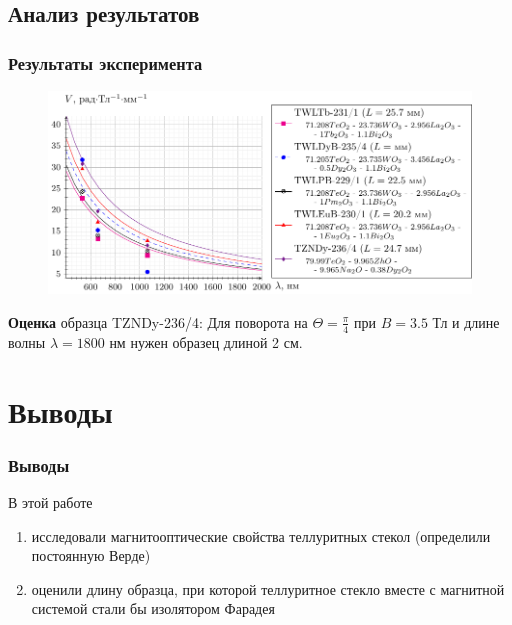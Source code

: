 \documentclass[10pt,pdf,hyperref={unicode}, dvipsnames]{beamer}
\begin{document}

\begin{frame}[t]
	\subsection{Анализ результатов}
	\frametitle{Результаты эксперимента}
	
	\begin{figure}[tb]
		\centering
		\includegraphics[width=1\textwidth]{images/graph_verde_from_lambda}
	\end{figure}
	
	\textbf{Оценка} образца TZNDy-236/4: Для поворота на $\Theta=\frac{\pi}{4}$ при $B=3.5$ Тл и длине волны $\lambda=1800$ нм нужен образец длиной 2 см.
	
	
	
\end{frame}


\section{Выводы}
\begin{frame}
	\frametitle{Выводы}
	В этой работе 
	\begin{enumerate}
		\item 
		      исследовали магнитооптические свойства теллуритных стекол (определили постоянную Верде)
		\item 
		      оценили длину образца, при которой теллуритное стекло вместе с магнитной системой стали бы изолятором Фарадея
	\end{enumerate}
\end{frame}
\end{document}
